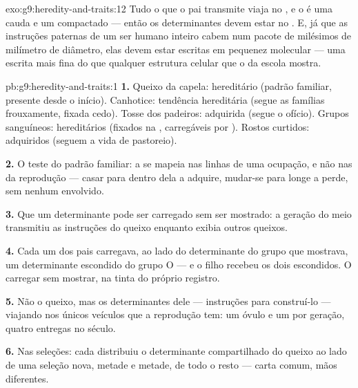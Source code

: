 \begin{solution}{exo:g9:heredity-and-traits:12}
Tudo o que o pai transmite viaja no , e o
 é uma cauda e um  compactado --- então
os determinantes devem estar no . E, já que as
instruções paternas de um ser humano inteiro cabem num
pacote de milésimos de milímetro de diâmetro, elas devem
estar escritas em pequenez molecular --- uma escrita mais
fina do que qualquer estrutura celular que o  da
escola mostra.
\end{solution}

\begin{solution}{pb:g9:heredity-and-traits:1}
\textbf{1.} Queixo da capela: hereditário (padrão familiar,
presente desde o início). Canhotice: tendência hereditária
(segue as famílias frouxamente, fixada cedo). Tosse dos
padeiros: adquirida (segue o ofício). Grupos sanguíneos:
hereditários (fixados na , carregáveis por
). Rostos curtidos: adquiridos (seguem a vida de
pastoreio).

\textbf{2.} O teste do padrão familiar: a  se
mapeia nas linhas de uma ocupação, e não nas da reprodução
--- casar para dentro dela a adquire, mudar-se para longe a
perde, sem  nenhum envolvido.

\textbf{3.} Que um determinante pode ser carregado sem ser
mostrado: a geração do meio transmitiu as instruções do
queixo enquanto exibia outros queixos.

\textbf{4.} Cada um dos pais carregava, ao lado do
determinante do grupo que mostrava, um determinante
escondido do grupo O --- e o filho recebeu os dois
escondidos. O carregar sem mostrar, na tinta do próprio
registro.

\textbf{5.} Não o queixo, mas os determinantes dele ---
instruções para construí-lo --- viajando nos únicos veículos
que a reprodução tem: um óvulo e um  por
geração, quatro entregas no século.

\textbf{6.} Nas seleções: cada  distribuiu o
determinante compartilhado do queixo ao lado de uma seleção
nova, metade e metade, de todo o resto --- carta comum, mãos
diferentes.


\end{solution}
